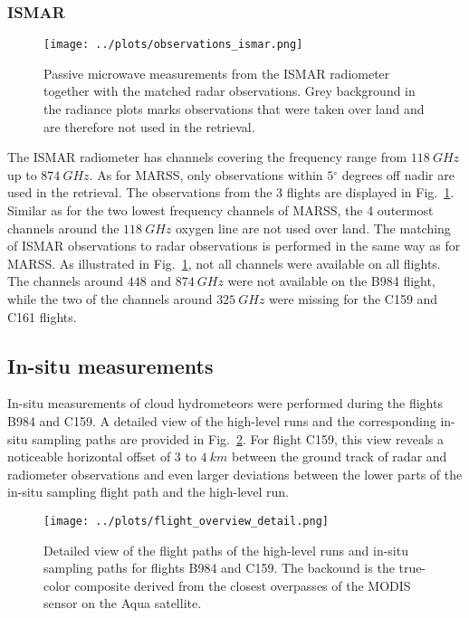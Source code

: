 \documentclass[journal abbreviation, manuscript]{copernicus}
\begin{document}
\subsubsection{ISMAR}

\begin{figure}[h!]
  \centering
  \texttt{[image: ../plots/observations\_ismar.png]}
  \caption{
    Passive microwave measurements from the ISMAR radiometer together with the
    matched radar observations. Grey background in the radiance plots marks
    observations that were taken over land and are therefore not used in
    the retrieval.
    }
  \label{fig:observations_ismar}
\end{figure}

The ISMAR radiometer has channels covering the frequency range from
$118\ \unit{GHz}$ up to $874\ \unit{GHz}$. As for MARSS, only observations
within $5\unit{^\circ}$ degrees off nadir are used in the retrieval. The
observations from the 3 flights are displayed in
Fig.~\ref{fig:observations_ismar}. Similar as for the two lowest frequency
channels of MARSS, the 4 outermost channels around the $118\ \unit{GHz}$ oxygen
line are not used over land. The matching of ISMAR observations to radar
observations is performed in the same way as for MARSS. As illustrated in
Fig.~\ref{fig:observations_ismar}, not all channels were available on all
flights. The channels around $448$ and $874\ \unit{GHz}$ were not available on
the B984 flight, while the two of the channels around $325\ \unit{GHz}$ were
missing for the C159 and C161 flights.


\subsection{In-situ measurements}
\label{sec:in_situ}

In-situ measurements of cloud hydrometeors were performed during the flights
B984 and C159. A detailed view of the high-level runs and the corresponding
in-situ sampling paths are provided in Fig.~\ref{fig:flight_overview_detail}.
For flight C159, this view reveals a noticeable horizontal offset of $3$ to
$4\ \unit{km}$ between the ground track of radar and radiometer observations and
even larger deviations between the lower parts of the in-situ sampling flight
path and the high-level run.

\begin{figure}[h!]
  \centering
  \texttt{[image: ../plots/flight\_overview\_detail.png]}
  \caption{
    Detailed view of the flight paths of the high-level runs and in-situ sampling
    paths for flights B984 and C159. The backound is the true-color composite
    derived from the closest overpasses of the MODIS \citep{modis} sensor
    on the Aqua satellite.
    }
  \label{fig:flight_overview_detail}
\end{figure}
\end{document}

